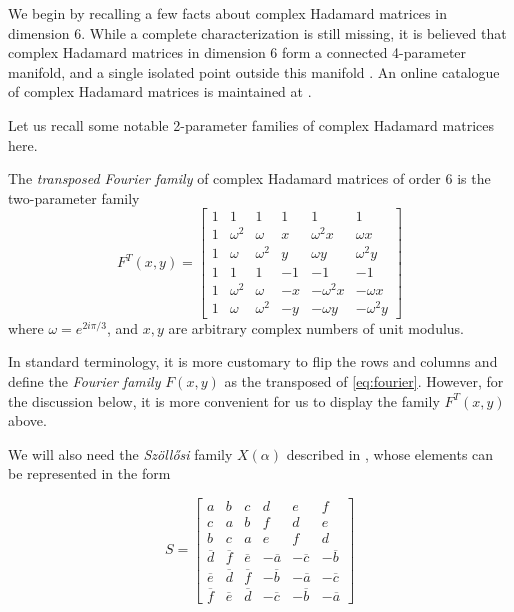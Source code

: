 \documentclass[12pt]{amsart}
\numberwithin{equation}{section}
\newcommand*\conj[1]{\overline{#1}}
\newcommand{\om}{\omega}
\theoremstyle{definition}
\theoremstyle{remark}
\theoremstyle{remark}
\begin{document}
\medskip

We begin by recalling a few facts about complex Hadamard matrices in dimension 6. While a complete characterization is still missing, it is believed that complex Hadamard matrices in dimension 6 form a connected 4-parameter manifold, and a single isolated point outside this manifold \cite{generic}. An online catalogue of complex Hadamard matrices is maintained at \cite{cat}.

Let us recall some notable 2-parameter families of complex Hadamard matrices here. 

\medskip

The {\it transposed Fourier family} of complex Hadamard matrices of order 6 is the two-parameter family
\begin{equation}\label{eq:fourier}
F^T(x,y)=\left[
		\begin{array}{cccccc}
			1 & 1 & 1 & 1 & 1 & 1 \\
			1 & \om^2 & \om & x &  \om^2 x& \om x \\
			1 & \om & \om^2 & y &  \om y& \om^2y \\
			1 & 1 & 1 & -1 & -1 & -1 \\
			1 & \om^2 & \om & -x &  -\om^2x& -\om x \\
			1 &  \om& \om^2 & -y &  -\om y& -\om^2 y
		\end{array}\right]%
\end{equation} where $\om=e^{2i\pi/3}$, and $x, y$ are arbitrary complex numbers of unit modulus.

\medskip

In standard terminology, it is more customary to flip the rows and columns  and  define the {\it Fourier family}  $F(x, y)$ as the transposed of \eqref{eq:fourier}. However, for the discussion below, it is more convenient for us to display the family $F^T(x,y)$ above.  

\medskip

We will also need the {\it Sz\"oll\H osi} family $X(\alpha)$ described in \cite{Sz}, whose elements can be represented in the form

\begin{equation}\label{eqsz}
S=\left[
	\begin{array}{cccccc}
		a & b & c & d & e & f \\
		c & a & b & f & d & e \\
		b & c & a & e & f & d \\
		\conj{d} & \conj{f} & \conj{e} & -\conj{a} & -\conj{c} & -\conj{b} \\
		\conj{e} & \conj{d} & \conj{f} & -\conj{b} &  -\conj{a}& -\conj{c} \\
		\conj{f} & \conj{e}& \conj{d} &  -\conj{c}&  -\conj{b}& -\conj{a}
	\end{array}\right]
\end{equation}
\end{document}
